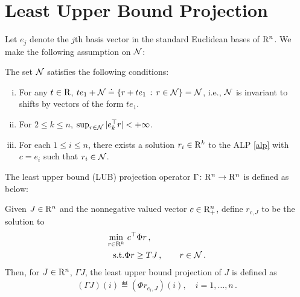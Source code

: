\section{Least Upper Bound Projection}\label{sec:lubp}
Let $e_j$ denote the $j$th basis vector in the standard Euclidean bases of $\mathrm{R}^n$.
We make the following assumption on $\mathcal{N}$:
\begin{assumption}
\label{ass:n}
The set $\mathcal{N}$ satisfies the following conditions:
\begin{enumerate}[(i)]
\item \label{ass:n1}
For any $t\in \mathrm{R}$, $t e_1 + \mathcal{N} \doteq \{ r + t e_1 \,:\, r\in \mathcal{N} \} = \mathcal{N}$, i.e., 
$\mathcal{N}$ is invariant to shifts by vectors of the form $t e_1$.
\item \label{ass:n2}
For $2\le k \le n$, $\sup_{r\in \mathcal{N}} | e_k^\top r | <+\infty$.
\item \label{ass:n3}
For each $1\le i \le n$, there exists a solution $r_i\in \mathrm{R}^k$ to the ALP \eqref{alp} with $c = e_i$ such that
$r_i\in \mathcal{N}$.
\end{enumerate}
\end{assumption}
The least upper bound (LUB) projection operator $\Gamma \colon \mathrm{R}^n \rightarrow\mathrm{R}^n$ is defined as below:
\begin{definition}\label{lubpop}
Given $J\in \mathrm{R}^n$ and the nonnegative valued vector $c\in \mathrm{R}^n_+$, define $r_{c,J}$ to be the solution to 
\begin{align}
\label{lubplp}
\begin{split}
 \underset{r\in \R^k}{\min} &\,\, c^\top \Phi r\,,\\
 \text{s.t.}& \mb \Phi r\geq  TJ\,, \qquad r\in \N\,.
 \end{split}
\end{align}
Then, for $J\in \mathrm{R}^n$, $\Gamma J$,
the least upper bound projection of $J$ is defined as 
\begin{align}\label{gamdef}
(\Gamma J)(i)\eqdef(\Phi r_{e_i,J})(i),\quad i=1,\ldots,n\,.
\end{align}
\end{definition}
